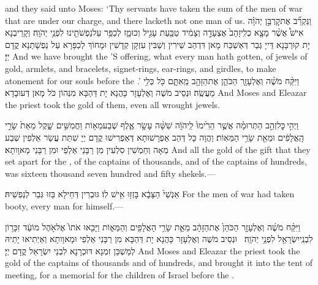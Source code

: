 {and they said unto Moses: ‘Thy servants have taken the sum of the men of war that are under our charge, and there lacketh not one man of us.}{}
{וַנַּקְרֵ֞ב אֶת\maqqaf קׇרְבַּ֣ן יְהֹוָ֗ה אִישׁ֩ אֲשֶׁ֨ר מָצָ֤א כְלִֽי\maqqaf זָהָב֙ אֶצְעָדָ֣ה וְצָמִ֔יד טַבַּ֖עַת עָגִ֣יל וְכוּמָ֑ז לְכַפֵּ֥ר עַל\maqqaf נַפְשֹׁתֵ֖ינוּ לִפְנֵ֥י יְהֹוָֽה׃}
{וְקָרֵיבְנָא יָת קוּרְבָּנָא דַּייָ גְּבַר דְּאַשְׁכַּח מָאן דִּדְהַב שֵׁירִין וְשַׁבִּין עִזְקָן קְדָשִׁין וּמָחוֹךְ לְכַפָּרָא עַל נַפְשָׁתַנָא קֳדָם יְיָ׃}
{And we have brought the \lord’S offering, what every man hath gotten, of jewels of gold, armlets, and bracelets, signet-rings, ear-rings, and girdles, to make atonement for our souls before the \lord.’}{}
{וַיִּקַּ֨ח מֹשֶׁ֜ה וְאֶלְעָזָ֧ר הַכֹּהֵ֛ן אֶת\maqqaf הַזָּהָ֖ב מֵֽאִתָּ֑ם כֹּ֖ל כְּלִ֥י מַעֲשֶֽׂה׃}
{וּנְסֵיב מֹשֶׁה וְאֶלְעָזָר כָּהֲנָא יָת דַּהְבָּא מִנְּהוֹן כֹּל מָאן דְּעוּבָדָא׃}
{And Moses and Eleazar the priest took the gold of them, even all wrought jewels.}{}

{וַיְהִ֣י \legarmeh  כׇּל\maqqaf זְהַ֣ב הַתְּרוּמָ֗ה אֲשֶׁ֤ר הֵרִ֙ימוּ֙ לַֽיהֹוָ֔ה שִׁשָּׁ֨ה עָשָׂ֥ר אֶ֛לֶף שְׁבַע\maqqaf מֵא֥וֹת וַחֲמִשִּׁ֖ים שָׁ֑קֶל מֵאֵת֙ שָׂרֵ֣י הָֽאֲלָפִ֔ים וּמֵאֵ֖ת שָׂרֵ֥י הַמֵּאֽוֹת׃}
{וַהֲוָה כָּל דְּהַב אַפְרָשׁוּתָא דְּאַפְרִישׁוּ קֳדָם יְיָ שִׁתַּת עֲשַׂר אַלְפִין שְׁבַע מְאָה וְחַמְשִׁין סִלְעִין מִן רַבָּנֵי אַלְפֵי וּמִן רַבָּנֵי מָאוָותָא׃}
{And all the gold of the gift that they set apart for the \lord, of the captains of thousands, and of the captains of hundreds, was sixteen thousand seven hundred and fifty shekels.—}{}

{אַנְשֵׁי֙ הַצָּבָ֔א בָּזְז֖וּ אִ֥ישׁ לֽוֹ׃}
{גּוּבְרִין דְּחֵילָא בַּזוּ גְּבַר לְנַפְשֵׁיהּ׃}
{For the men of war had taken booty, every man for himself.—}{}

{וַיִּקַּ֨ח מֹשֶׁ֜ה וְאֶלְעָזָ֤ר הַכֹּהֵן֙ אֶת\maqqaf הַזָּהָ֔ב מֵאֵ֛ת שָׂרֵ֥י הָאֲלָפִ֖ים וְהַמֵּא֑וֹת וַיָּבִ֤אוּ אֹתוֹ֙ אֶל\maqqaf אֹ֣הֶל מוֹעֵ֔ד זִכָּר֥וֹן לִבְנֵֽי\maqqaf יִשְׂרָאֵ֖ל לִפְנֵ֥י יְהֹוָֽה׃ \petucha }
{וּנְסֵיב מֹשֶׁה וְאֶלְעָזָר כָּהֲנָא יָת דַּהְבָּא מִן רַבָּנֵי אַלְפֵי וּמָאוָותָא וְאֵיְתִיאוּ יָתֵיהּ לְמַשְׁכַּן זִמְנָא דּוּכְרָנָא לִבְנֵי יִשְׂרָאֵל קֳדָם יְיָ׃}
{And Moses and Eleazar the priest took the gold of the captains of thousands and of hundreds, and brought it into the tent of meeting, for a memorial for the children of Israel before the \lord.}{}


